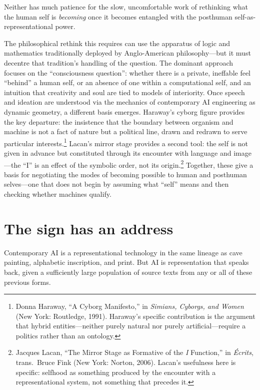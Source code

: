 Neither has much patience for the slow, uncomfortable work of rethinking what the human self is \textit{becoming} once it becomes entangled with the posthuman self-as-representational power.

The philosophical rethink this requires can use the apparatus of logic and mathematics traditionally deployed by Anglo-American philosophy---but it must decentre that tradition's handling of the question. The dominant approach focuses on the ``consciousness question'': whether there is a private, ineffable feel ``behind'' a human self, or an absence of one within a computational self, and an intuition that creativity and soul are tied to models of interiority. Once speech and ideation are understood via the mechanics of contemporary AI engineering as dynamic geometry, a different basis emerges. Haraway's cyborg figure provides the key departure: the insistence that the boundary between organism and machine is not a fact of nature but a political line, drawn and redrawn to serve particular interests.\footnote{Donna Haraway, ``A Cyborg Manifesto,'' in \emph{Simians, Cyborgs, and Women} (New York: Routledge, 1991). Haraway's specific contribution is the argument that hybrid entities---neither purely natural nor purely artificial---require a politics rather than an ontology.} Lacan's mirror stage provides a second tool: the self is not given in advance but constituted through its encounter with language and image---the ``I'' is an effect of the symbolic order, not its origin.\footnote{Jacques Lacan, ``The Mirror Stage as Formative of the \emph{I} Function,'' in \emph{\'Ecrits}, trans.\ Bruce Fink (New York: Norton, 2006). Lacan's usefulness here is specific: selfhood as something produced by the encounter with a representational system, not something that precedes it.} Together, these give a basis for negotiating the modes of becoming possible to human and posthuman selves---one that does not begin by assuming what ``self'' means and then checking whether machines qualify.


\section{The sign has an address}

Contemporary AI is a representational technology in the same lineage as cave painting, alphabetic inscription, and print. But AI is representation that speaks back, given a sufficiently large population of source texts from any or all of these previous forms.

